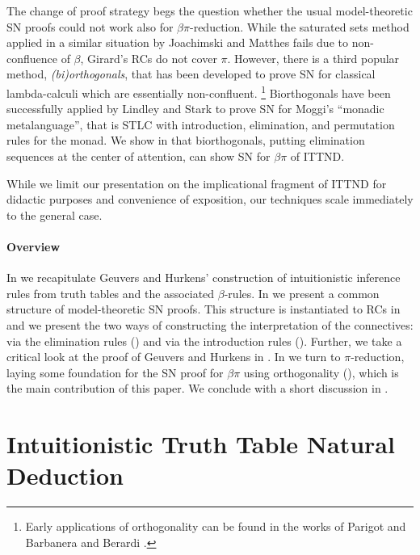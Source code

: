 \documentclass[a4paper,USenglish,cleveref, autoref, thm-restate]{lipics-v2019}
\begin{document}
The change of proof strategy begs the question whether the usual
model-theoretic SN proofs could not work also for
$\beta\pi$-reduction.  While the saturated sets method applied in
a similar situation by Joachimski and Matthes
\cite{joachimskiMatthes:rta00} fails due to non-confluence of $\beta$,
Girard's RCs do not cover $\pi$.  However, there is a third popular
method, \emph{(bi)orthogonals}, that has been developed to prove SN
for classical lambda-calculi which are essentially non-confluent.
\footnote{Early applications of orthogonality can be found in the
  works of Parigot \cite{parigot:jsl97,parigot:lamsym} and Barbanera
  and Berardi \cite{barbanera:lamsym}.}
Biorthogonals have been successfully applied by
Lindley and Stark \cite{lindleyStark:tlca05} to prove SN for Moggi's
``monadic metalanguage'', that is STLC with introduction, elimination,
and permutation rules for the monad.  We show in  that
biorthogonals, putting elimination sequences at the center of
attention, can show SN for $\beta\pi$ of ITTND.

While we limit our presentation on the implicational fragment of ITTND
for didactic purposes and convenience of exposition, our techniques
scale immediately to the general case.

\paragraph*{Overview}
%
In  we recapitulate Geuvers and Hurkens' construction of
intuitionistic inference rules from truth tables and the associated
$\beta$-rules.
%
In  we present a common structure of model-theoretic
SN proofs.
%
This structure is instantiated to RCs in  and we present
the two ways of constructing the interpretation of the connectives:
via the elimination rules () and via the
introduction rules ().  Further, we take a
critical look at the proof of Geuvers and Hurkens
\cite{geuversHurkens:types17} in .
%
In  we turn to $\pi$-reduction, laying some foundation
for the SN proof for $\beta\pi$ using orthogonality
(), which is the main contribution of this paper.
%
We conclude with a short discussion in .


\section{Intuitionistic Truth Table Natural Deduction}
\label{sec:nd}
\end{document}
